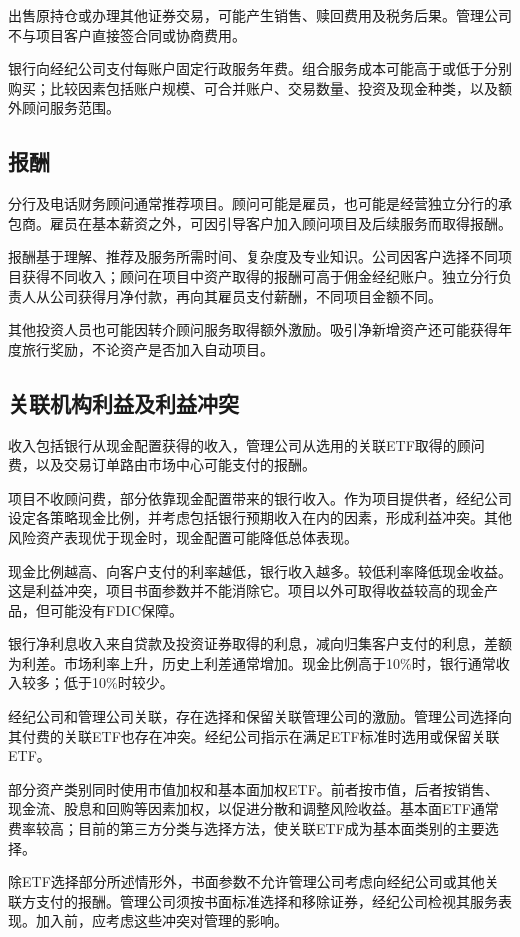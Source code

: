 \documentclass[UTF8,fontset=none,11pt,a4paper]{ctexart}
\begin{document}
出售原持仓或办理其他证券交易，可能产生销售、赎回费用及税务后果。管理公司不与项目客户直接签合同或协商费用。


银行向经纪公司支付每账户固定行政服务年费。组合服务成本可能高于或低于分别购买；比较因素包括账户规模、可合并账户、交易数量、投资及现金种类，以及额外顾问服务范围。


\subsection*{报酬}
分行及电话财务顾问通常推荐项目。顾问可能是雇员，也可能是经营独立分行的承包商。雇员在基本薪资之外，可因引导客户加入顾问项目及后续服务而取得报酬。


报酬基于理解、推荐及服务所需时间、复杂度及专业知识。公司因客户选择不同项目获得不同收入；顾问在项目中资产取得的报酬可高于佣金经纪账户。独立分行负责人从公司获得月净付款，再向其雇员支付薪酬，不同项目金额不同。


其他投资人员也可能因转介顾问服务取得额外激励。吸引净新增资产还可能获得年度旅行奖励，不论资产是否加入自动项目。


\subsection*{关联机构利益及利益冲突}
收入包括银行从现金配置获得的收入，管理公司从选用的关联ETF取得的顾问费，以及交易订单路由市场中心可能支付的报酬。


项目不收顾问费，部分依靠现金配置带来的银行收入。作为项目提供者，经纪公司设定各策略现金比例，并考虑包括银行预期收入在内的因素，形成利益冲突。其他风险资产表现优于现金时，现金配置可能降低总体表现。


现金比例越高、向客户支付的利率越低，银行收入越多。较低利率降低现金收益。这是利益冲突，项目书面参数并不能消除它。项目以外可取得收益较高的现金产品，但可能没有FDIC保障。


银行净利息收入来自贷款及投资证券取得的利息，减向归集客户支付的利息，差额为利差。市场利率上升，历史上利差通常增加。现金比例高于10\%时，银行通常收入较多；低于10\%时较少。


经纪公司和管理公司关联，存在选择和保留关联管理公司的激励。管理公司选择向其付费的关联ETF也存在冲突。经纪公司指示在满足ETF标准时选用或保留关联ETF。


部分资产类别同时使用市值加权和基本面加权ETF。前者按市值，后者按销售、现金流、股息和回购等因素加权，以促进分散和调整风险收益。基本面ETF通常费率较高；目前的第三方分类与选择方法，使关联ETF成为基本面类别的主要选择。


除ETF选择部分所述情形外，书面参数不允许管理公司考虑向经纪公司或其他关联方支付的报酬。管理公司须按书面标准选择和移除证券，经纪公司检视其服务表现。加入前，应考虑这些冲突对管理的影响。
\end{document}
